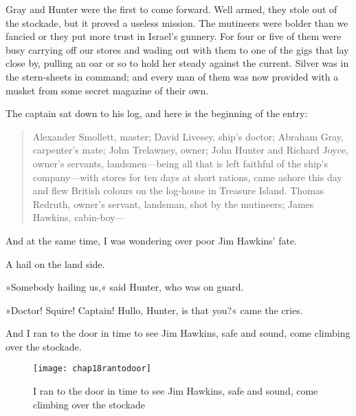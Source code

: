 Gray and Hunter were the first to come forward. Well armed, they stole out of the stockade, but it proved a useless mission. The mutineers were bolder than we fancied or they put more trust in Israel's gunnery. For four or five of them were busy carrying off our stores and wading out with them to one of the gigs that lay close by, pulling an oar or so to hold her steady against the current. Silver was in the stern-sheets in command; and every man of them was now provided with a musket from some secret magazine of their own.

The captain sat down to his log, and here is the beginning of the entry:
\begin{quote}
Alexander Smollett, master; David Livesey, ship's doctor; Abraham Gray, carpenter's mate; John Trelawney, owner; John Hunter and Richard Joyce, owner's servants, landsmen—being all that is left faithful of the ship's company—with stores for ten days at short rations, came ashore this day and flew British colours on the log-house in Treasure Island. Thomas Redruth, owner's servant, landsman, shot by the mutineers; James Hawkins, cabin-boy—
\end{quote}

And at the same time, I was wondering over poor Jim Hawkins' fate.

A hail on the land side.

»Somebody hailing us,« said Hunter, who was on guard.

»Doctor! Squire! Captain! Hullo, Hunter, is that you?« came the cries.

And I ran to the door in time to see Jim Hawkins, safe and sound, come climbing over the stockade.


  \begin{figure}[p]
\centering
\texttt{[image: chap18rantodoor]}
\caption[Jim Hawkins, safe and sound]{I ran to the door in time to see Jim Hawkins, safe and sound, come climbing over the stockade}
\end{figure} 